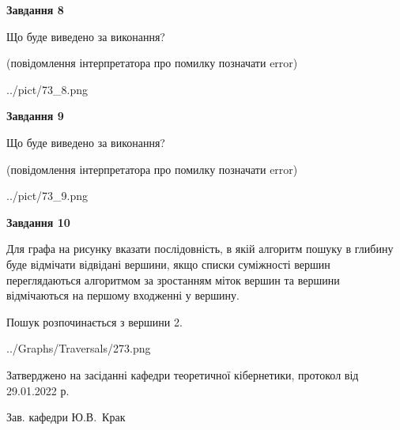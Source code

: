 \documentclass[12pt, ukrainian]{article}
\begin{document}
{\begin {large}
{\begin {center}\textbf{Завдання 8}\end {center}}\par
Що буде виведено за виконання?\par
 (повідомлення інтерпретатора про помилку позначати error)\par
\begin{center}
	{../pict/73_8.png}
\end{center}
\newpage

{\begin {center}\textbf{Завдання 9}\end {center}}\par
Що буде виведено за виконання?\par
 (повідомлення інтерпретатора про помилку позначати error)\par
\begin{center}
	{../pict/73_9.png}
\end{center}
\newpage

{\begin {center}\textbf{Завдання 10}\end {center}}\par
Для графа на рисунку вказати послідовність, в якій алгоритм пошуку в глибину буде відмічати відвідані вершини, якщо списки суміжності вершин переглядаються алгоритмом за зростанням міток вершин та вершини відмічаються на першому вход\-женні у вершину.\par
Пошук розпочинається з вершини 2.\par

\begin{center}
	{../Graphs/Traversals/273.png}
\end{center}\par
\newpage


\end {large}
}
{\smallskip \begin {small} Затверджено на засіданні кафедри теоретичної кібернетики, протокол  від   29.01.2022 р.\par\smallskip\smallskip
{\parbox {6.5 cm}{Зав. кафедри \dotfill Ю.В.~Крак}} \end{small}}
\end{document}
